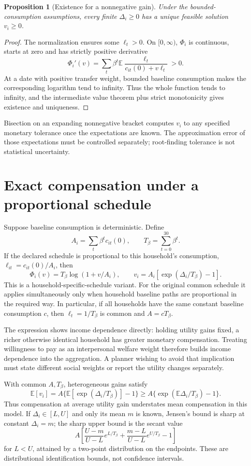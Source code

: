 \documentclass[11pt]{article}
\newtheorem{proposition}{Proposition}
\newcommand{\E}{\mathbb E}
\begin{document}
\begin{proposition}[Existence for a nonnegative gain]
Under the bounded-consumption assumptions, every finite $\Delta_i\geq0$ has a unique feasible solution $v_i\geq0$.
\end{proposition}
\begin{proof}
The normalization ensures some $\ell_t>0$. On $[0,\infty)$, $\Phi_i$ is continuous, starts at zero and has strictly positive derivative
\[
 \Phi_i'(v)=\sum_t\beta^t\E\frac{\ell_t}{c_{it}(0)+v\ell_t}>0.
\]
At a date with positive transfer weight, bounded baseline consumption makes the corresponding logarithm tend to infinity. Thus the whole function tends to infinity, and the intermediate value theorem plus strict monotonicity gives existence and uniqueness.
\end{proof}
Bisection on an expanding nonnegative bracket computes $v_i$ to any specified monetary tolerance once the expectations are known. The approximation error of those expectations must be controlled separately; root-finding tolerance is not statistical uncertainty.

\section*{Exact compensation under a proportional schedule}
Suppose baseline consumption is deterministic. Define
\[
 A_i=\sum_t\beta^t c_{it}(0),\qquad T_\beta=\sum_{t=0}^{30}\beta^t.
\]
If the declared schedule is proportional to this household's consumption, $\ell_{it}=c_{it}(0)/A_i$, then
\[
 \Phi_i(v)=T_\beta\log(1+v/A_i),\qquad
                 v_i=A_i[\exp(\Delta_i/T_\beta)-1].
\]
This is a household-specific-schedule variant. For the original common schedule it applies simultaneously only when household baseline paths are proportional in the required way. In particular, if all households have the same constant baseline consumption $c$, then $\ell_t=1/T_\beta$ is common and $A=cT_\beta$.

The expression shows income dependence directly: holding utility gains fixed, a richer otherwise identical household has greater monetary compensation. Treating willingness to pay as an interpersonal welfare weight therefore builds income dependence into the aggregation. A planner wishing to avoid that implication must state different social weights or report the utility changes separately.

With common $A,T_\beta$, heterogeneous gains satisfy
\[
 \E[v_i]=A\{\E[\exp(\Delta_i/T_\beta)]-1\}
       \geq A\{\exp(\E\Delta_i/T_\beta)-1\}.
\]
Thus compensation at average utility gain understates mean compensation in this model. If $\Delta_i\in[L,U]$ and only its mean $m$ is known, Jensen's bound is sharp at constant $\Delta_i=m$; the sharp upper bound is the secant value
\[
 A\left[\frac{U-m}{U-L}e^{L/T_\beta}
       +\frac{m-L}{U-L}e^{U/T_\beta}-1\right]
\]
for $L<U$, attained by a two-point distribution on the endpoints. These are distributional identification bounds, not confidence intervals.
\end{document}

